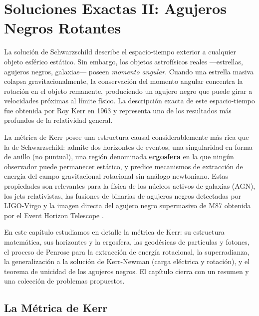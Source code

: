 
\chapter{Soluciones Exactas II: Agujeros Negros Rotantes}
\label{cap:kerr}

La solución de Schwarzschild describe el espacio-tiempo exterior a cualquier objeto esférico estático. Sin embargo, los objetos astrofísicos reales —estrellas, agujeros negros, galaxias— poseen \emph{momento angular}. Cuando una estrella masiva colapsa gravitacionalmente, la conservación del momento angular concentra la rotación en el objeto remanente, produciendo un agujero negro que puede girar a velocidades próximas al límite físico. La descripción exacta de este espacio-tiempo fue obtenida por Roy Kerr en 1963 \cite{Kerr1963} y representa uno de los resultados más profundos de la relatividad general.

La métrica de Kerr posee una estructura causal considerablemente más rica que la de Schwarzschild: admite dos horizontes de eventos, una singularidad en forma de anillo (no puntual), una región denominada \textbf{ergosfera} en la que ningún observador puede permanecer estático, y predice mecanismos de extracción de energía del campo gravitacional rotacional sin análogo newtoniano. Estas propiedades son relevantes para la física de los núcleos activos de galaxias (AGN), los jets relativistas, las fusiones de binarias de agujeros negros detectadas por LIGO-Virgo \cite{Abbott2016prl} y la imagen directa del agujero negro supermasivo de M87 obtenida por el Event Horizon Telescope \cite{EHT2019}.

En este capítulo estudiamos en detalle la métrica de Kerr: su estructura matemática, sus horizontes y la ergosfera, las geodésicas de partículas y fotones, el proceso de Penrose para la extracción de energía rotacional, la superradianza, la generalización a la solución de Kerr-Newman (carga eléctrica y rotación), y el teorema de unicidad de los agujeros negros. El capítulo cierra con un resumen y una colección de problemas propuestos.

\section{La Métrica de Kerr}
\label{sec:metrica_kerr}


